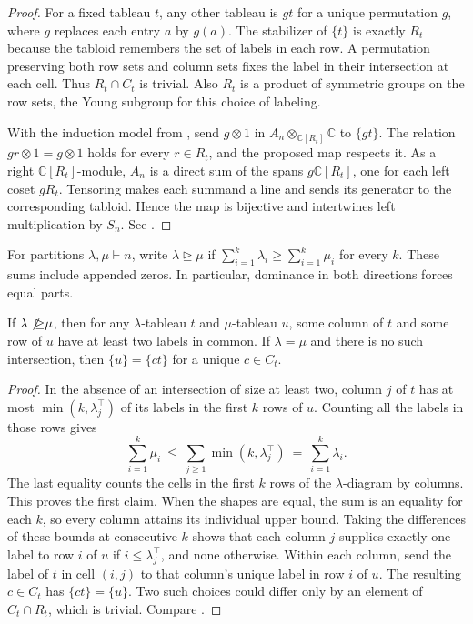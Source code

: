 \begin{proof}
For a fixed tableau \(t\), any other tableau is \(gt\) for a unique
permutation \(g\), where \(g\) replaces each entry \(a\) by \(g(a)\).
The stabilizer of \(\{t\}\) is exactly \(R_t\) because the tabloid
remembers the set of labels in each row. A permutation preserving both
row sets and column sets fixes the label in their intersection at each
cell. Thus \(R_t\cap C_t\) is trivial. Also \(R_t\) is a product of
symmetric groups on the row sets, the Young subgroup for this choice
of labeling.

With the induction model from \cite[Chapter 9]{algebra-core}, send
\(g\otimes 1\) in \(A_n\otimes_{\mathbb C[R_t]}\mathbb C\) to \(\{gt\}\).
The relation \(gr\otimes 1=g\otimes 1\) holds for every \(r\in R_t\),
and the proposed map respects it. As a right \(\mathbb C[R_t]\)-module,
\(A_n\) is a direct sum of the spans \(g\mathbb C[R_t]\), one for each
left coset \(gR_t\). Tensoring makes each summand a line and sends its
generator to the corresponding tabloid. Hence the map is bijective
and intertwines left multiplication by \(S_n\). See
\cite[\S2.1, Theorem 2.1.12]{sagan}.
\end{proof}

For partitions \(\lambda,\mu\vdash n\), write \(\lambda\unrhd\mu\) if
\(\sum_{i=1}^k\lambda_i\geq\sum_{i=1}^k\mu_i\) for every \(k\).
These sums include appended zeros. In particular, dominance in both
directions forces equal parts.

\begin{lemma}
\label{res:A03}
If \(\lambda\not\unrhd\mu\), then for any \(\lambda\)-tableau \(t\) and
\(\mu\)-tableau \(u\), some column of \(t\) and some row of \(u\) have at
least two labels in common. If \(\lambda=\mu\) and there is no such
intersection, then \(\{u\}=\{ct\}\) for a unique \(c\in C_t\).
\end{lemma}

\begin{proof}
In the absence of an intersection of size at least two, column \(j\)
of \(t\) has at most \(\min(k,\lambda^\top_j)\) of its labels in the
first \(k\) rows of \(u\). Counting all the labels in those rows gives
\[
  \sum_{i=1}^k\mu_i
  \ \leq\ \sum_{j\geq 1}\min(k,\lambda^\top_j)
  \ =\ \sum_{i=1}^k\lambda_i .
\]
The last equality counts the cells in the first \(k\) rows of the
\(\lambda\)-diagram by columns. This proves the first claim. When the
shapes are equal, the sum is an equality for each \(k\), so every
column attains its individual upper bound. Taking the differences of
these bounds at consecutive \(k\) shows that each column \(j\) supplies
exactly one label to row \(i\) of \(u\) if \(i\leq\lambda^\top_j\),
and none otherwise. Within each column, send the label of \(t\) in
cell \((i,j)\) to that column's unique label in row \(i\) of \(u\).
The resulting \(c\in C_t\) has \(\{ct\}=\{u\}\). Two such choices
could differ only by an element of \(C_t\cap R_t\), which is trivial.
Compare \cite[\S\S2.2--2.3]{sagan}.
\end{proof}

